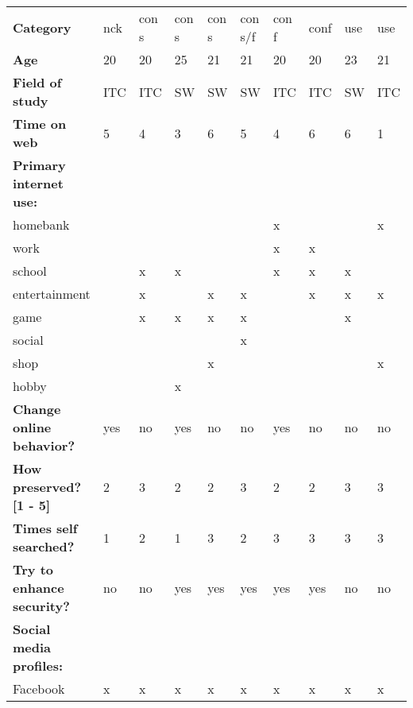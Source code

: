 \begin{table}
    \centering
    \begin{tabular}{llllllllll}
    \textbf{Category} & nck & con s & con s & con s & con s/f & con f & conf & use & use \\
    \textbf{Age} & 20  & 20    & 25    & 21    & 21      & 20    & 20   & 23  & 21  \\
    \textbf{Field of study} & ITC & ITC  & SW    & SW    & SW      & ITC   & ITC  & SW  & ITC \\
    \textbf{Time on web} & 5   & 4     & 3     & 6     & 5       & 4     & 6    & 6   & 1   \\
    \textbf{Primary internet use:} &  &  &  &  &  &  &  &  & \\
    homebank        &     &       &       &       &         & x     &      &     & x   \\
    work            &     &       &       &       &         & x     & x    &     &     \\
    school          &     & x     & x     &       &         & x     & x    & x   &     \\
    entertainment   &     & x     &       & x     & x       &       & x    & x   & x   \\
    game            &     & x     & x     & x     & x       &       &      & x   &     \\
    social          &     &       &       &       & x       &       &      &     &     \\
    shop            &     &       &       & x     &         &       &      &     & x   \\
    hobby           &     &       & x     &       &         &       &      &     &     \\
    \textbf{Change online behavior?} & yes & no    & yes   & no    & no      & yes   & no   & no  & no  \\
    \textbf{How preserved? [1 - 5]} & 2   & 3     & 2     & 2     & 3       & 2     & 2    & 3   & 3   \\
    \textbf{Times self searched?}  & 1   & 2     & 1     & 3     & 2       & 3     & 3    & 3   & 3   \\
    \textbf{Try to enhance security?}         & no  & no    & yes   & yes   & yes     & yes   & yes  & no  & no  \\
    \textbf{Social media profiles:} &  &  &  &  &  &  &  &  & \\
    Facebook        & x   & x     & x     & x     & x       & x     & x    & x   & x   \\

\end{tabular}
\end{table}
